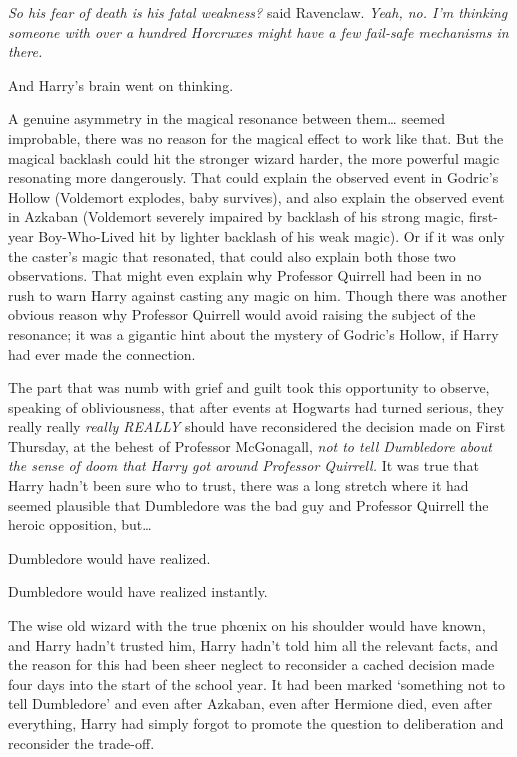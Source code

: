 \emph{So his fear of death is his fatal weakness?} said Ravenclaw. \emph{Yeah, no. I'm thinking someone with over a hundred Horcruxes might have a few fail-safe mechanisms in there.}

And Harry's brain went on thinking.

A genuine asymmetry in the magical resonance between them{\ldots} seemed improbable, there was no reason for the magical effect to work like that. But the magical backlash could hit the stronger wizard harder, the more powerful magic resonating more dangerously. That could explain the observed event in Godric's Hollow (Voldemort explodes, baby survives), and also explain the observed event in Azkaban (Voldemort severely impaired by backlash of his strong magic, first-year Boy-Who-Lived hit by lighter backlash of his weak magic). Or if it was only the caster's magic that resonated, that could also explain both those two observations. That might even explain why Professor Quirrell had been in no rush to warn Harry against casting any magic on him. Though there was another obvious reason why Professor Quirrell would avoid raising the subject of the resonance; it was a gigantic hint about the mystery of Godric's Hollow, if Harry had ever made the connection.

The part that was numb with grief and guilt took this opportunity to observe, speaking of obliviousness, that after events at Hogwarts had turned serious, they really really \emph{really REALLY} should have reconsidered the decision made on First Thursday, at the behest of Professor McGonagall, \emph{not to tell Dumbledore about the sense of doom that Harry got around Professor Quirrell.} It was true that Harry hadn't been sure who to trust, there was a long stretch where it had seemed plausible that Dumbledore was the bad guy and Professor Quirrell the heroic opposition, but{\ldots}

Dumbledore would have realized.

Dumbledore would have realized instantly.

The wise old wizard with the true phœnix on his shoulder would have known, and Harry hadn't trusted him, Harry hadn't told him all the relevant facts, and the reason for this had been sheer neglect to reconsider a cached decision made four days into the start of the school year. It had been marked `something not to tell Dumbledore' and even after Azkaban, even after Hermione died, even after everything, Harry had simply forgot to promote the question to deliberation and reconsider the trade-off.

